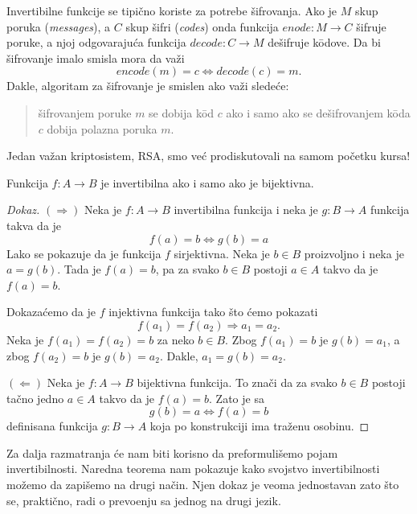 \medskip

\begin{EX}
  Invertibilne funkcije se tipi\v cno koriste za potrebe \v sifrovanja. Ako je $M$ skup
  poruka (\emph{messages}), a $C$ skup \v sifri (\emph{codes}) onda funkcija
  $
    \mathit{enode} : M \to C
  $
  \v sifruje poruke, a njoj odgovaraju\'ca funkcija
  $
    \mathit{decode} : C \to M
  $
  de\v sifruje k\=odove. Da bi \v sifrovanje imalo smisla mora da va\v zi
  $$
    \mathit{encode}(m) = c \Leftrightarrow \mathit{decode}(c) = m.
  $$
  Dakle, algoritam za \v sifrovanje je smislen ako va\v zi slede\'ce:
  \begin{quote}
    \v sifrovanjem poruke $m$ se dobija k\=od $c$ ako i samo ako se de\v sifrovanjem k\=oda $c$ dobija
    polazna poruka $m$.
  \end{quote}
  Jedan va\v zan kriptosistem, RSA, smo ve\'c prodiskutovali na samom po\v cetku kursa!
\end{EX}

\begin{THM}
  Funkcija $f : A \to B$ je invertibilna ako i samo ako je bijektivna.
\end{THM}
\begin{proof}[Dokaz]
  $(\Rightarrow)$
  Neka je $f : A \to B$ invertibilna funkcija i neka je $g : B \to A$ funkcija takva da je
  $$
    f(a) = b \Leftrightarrow g(b) = a
  $$
  Lako se pokazuje da je funkcija $f$ sirjektivna. Neka je $b \in B$ proizvoljno i neka je $a = g(b)$. Tada je
  $f(a) = b$, pa za svako $b \in B$ postoji $a \in A$ takvo da je $f(a) = b$.

  Dokaza\'cemo da je $f$ injektivna funkcija tako \v sto \'cemo pokazati
  $$
    f(a_1) = f(a_2) \Rightarrow a_1 = a_2.
  $$
  Neka je $f(a_1) = f(a_2) = b$ za neko $b \in B$. Zbog $f(a_1) = b$ je $g(b) = a_1$, a zbog
  $f(a_2) = b$ je $g(b) = a_2$. Dakle, $a_1 = g(b) = a_2$.

  $(\Leftarrow)$
  Neka je $f : A \to B$ bijektivna funkcija. To zna\v ci da za svako $b \in B$ postoji ta\v cno jedno
  $a \in A$ takvo da je $f(a) = b$. Zato je sa
  $$
    g(b) = a \Leftrightarrow f(a) = b
  $$
  definisana funkcija $g : B \to A$ koja po konstrukciji ima tra\v zenu osobinu.
\end{proof}

Za dalja razmatranja \'ce nam biti korisno da preformuli\v semo pojam invertibilnosti. Naredna teorema
nam pokazuje kako svojstvo invertibilnosti mo\v zemo da zapi\v semo na drugi na\v cin. Njen dokaz je veoma
jednostavan zato \v sto se, prakti\v cno, radi o prevo\dj enju sa jednog na drugi jezik.

